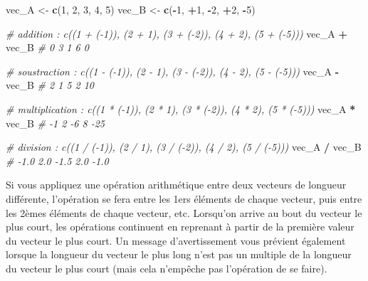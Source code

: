\documentclass[
]{book}
\newenvironment{Shaded}{\begin{snugshade}}{\end{snugshade}}
\newcommand{\CommentTok}[1]{\textcolor[rgb]{0.56,0.35,0.01}{\textit{#1}}}
\newcommand{\DecValTok}[1]{\textcolor[rgb]{0.00,0.00,0.81}{#1}}
\newcommand{\FunctionTok}[1]{\textcolor[rgb]{0.13,0.29,0.53}{\textbf{#1}}}
\newcommand{\NormalTok}[1]{#1}
\newcommand{\OtherTok}[1]{\textcolor[rgb]{0.56,0.35,0.01}{#1}}
\newcommand{\SpecialCharTok}[1]{\textcolor[rgb]{0.81,0.36,0.00}{\textbf{#1}}}
\begin{document}
\begin{Shaded}
\begin{Highlighting}[]
\NormalTok{vec\_A }\OtherTok{\textless{}{-}} \FunctionTok{c}\NormalTok{(}\DecValTok{1}\NormalTok{, }\DecValTok{2}\NormalTok{, }\DecValTok{3}\NormalTok{, }\DecValTok{4}\NormalTok{, }\DecValTok{5}\NormalTok{)}
\NormalTok{vec\_B }\OtherTok{\textless{}{-}} \FunctionTok{c}\NormalTok{(}\SpecialCharTok{{-}}\DecValTok{1}\NormalTok{, }\SpecialCharTok{+}\DecValTok{1}\NormalTok{, }\SpecialCharTok{{-}}\DecValTok{2}\NormalTok{, }\SpecialCharTok{+}\DecValTok{2}\NormalTok{, }\SpecialCharTok{{-}}\DecValTok{5}\NormalTok{)}

\CommentTok{\# addition : c((1 + ({-}1)), (2 + 1), (3 + ({-}2)), (4 + 2), (5 + ({-}5)))}
\NormalTok{vec\_A }\SpecialCharTok{+}\NormalTok{ vec\_B }\CommentTok{\# 0 3 1 6 0}

\CommentTok{\# soustraction : c((1 {-} ({-}1)), (2 {-} 1), (3 {-} ({-}2)), (4 {-} 2), (5 {-} ({-}5)))}
\NormalTok{vec\_A }\SpecialCharTok{{-}}\NormalTok{ vec\_B }\CommentTok{\# 2  1  5  2 10}

\CommentTok{\# multiplication : c((1 * ({-}1)), (2 * 1), (3 * ({-}2)), (4 * 2), (5 * ({-}5)))}
\NormalTok{vec\_A }\SpecialCharTok{*}\NormalTok{ vec\_B  }\CommentTok{\# {-}1   2  {-}6   8 {-}25}

\CommentTok{\# division : c((1 / ({-}1)), (2 / 1), (3 / ({-}2)), (4 / 2), (5 / ({-}5)))}
\NormalTok{vec\_A }\SpecialCharTok{/}\NormalTok{ vec\_B }\CommentTok{\# {-}1.0  2.0 {-}1.5  2.0 {-}1.0}
\end{Highlighting}
\end{Shaded}

Si vous appliquez une opération arithmétique entre deux vecteurs de longueur différente,
l'opération se fera entre les 1ers éléments de chaque vecteur, puis entre les 2èmes
éléments de chaque vecteur, etc. Lorsqu'on arrive au bout du vecteur le plus court,
les opérations continuent en reprenant à partir de la première valeur du vecteur
le plus court. Un message d'avertissement vous prévient également lorsque la longueur
du vecteur le plus long n'est pas un multiple de la longueur du vecteur le plus court (mais cela n'empêche pas l'opération de se faire).
\end{document}
